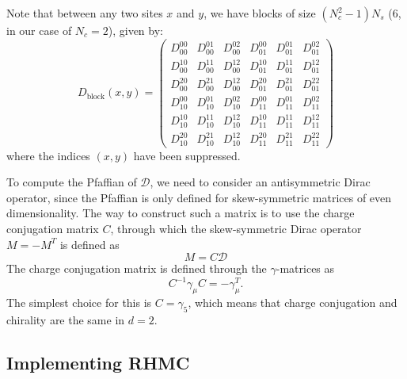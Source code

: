 Note that between any two sites $x$ and $y$, we have blocks of size $(N_c^2 - 1) N_s$ (6, in our case of $N_c = 2$), given by:
\begin{equation}
	D_\mathrm{block}(x, y) = \begin{pmatrix}
		D_{00}^{00} & D_{00}^{01} & D_{00}^{02} & D_{01}^{00} & D_{01}^{01} & D_{01}^{02}  \\
		
		D_{00}^{10} & D_{00}^{11} & D_{00}^{12} & D_{01}^{10} & D_{01}^{11} & D_{01}^{12} \\
		
		D_{00}^{20} & D_{00}^{21} & D_{00}^{12} & D_{01}^{20} & D_{01}^{21} & D_{01}^{22} \\

		D_{10}^{00} & D_{10}^{01} & D_{10}^{02} & D_{11}^{00} & D_{11}^{01} & D_{11}^{02}  \\
		
		D_{10}^{10} & D_{10}^{11} & D_{10}^{12} & D_{11}^{10} & D_{11}^{11} & D_{11}^{12} \\
		
		D_{10}^{20} & D_{10}^{21} & D_{10}^{12} & D_{11}^{20} & D_{11}^{21} & D_{11}^{22}
	\end{pmatrix}
\end{equation}
where the indices $(x, y)$ have been suppressed. 

To compute the Pfaffian of $\mathcal D$, we need to consider an antisymmetric Dirac operator, since the Pfaffian is only defined for skew-symmetric matrices of even dimensionality. The way to construct such a matrix is to use the charge conjugation matrix $C$, through which the skew-symmetric Dirac operator $M = -M^T$ is defined as
\begin{equation}
	M =  C \mathcal D
\end{equation}
The charge conjugation matrix is defined through the $\gamma$-matrices as 
\begin{equation}
	 C^{-1} \gamma_\mu  C = -\gamma_\mu^T.
\end{equation}
The simplest choice for this is $C = \gamma_5$, which means that charge conjugation and chirality are the same in $d = 2$. 

\subsection{Implementing RHMC}


